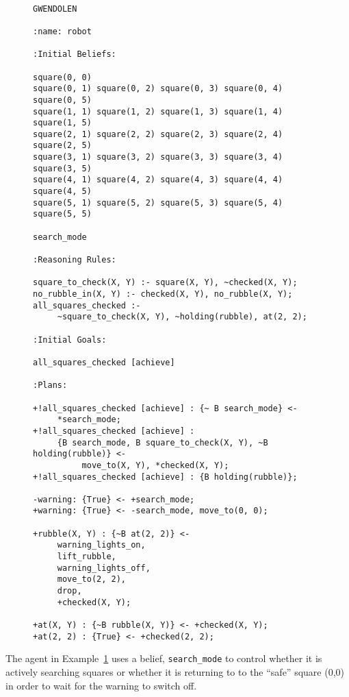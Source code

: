 \begin{figure}[!htbp]
\begin{ourexample}
\label{code:pickuprubble_nolock} \quad \\
\begin{lstlisting}[basicstyle=\sffamily,style=easslisting,language=Gwendolen]
GWENDOLEN

:name: robot

:Initial Beliefs:

square(0, 0) 
square(0, 1) square(0, 2) square(0, 3) square(0, 4) square(0, 5)
square(1, 1) square(1, 2) square(1, 3) square(1, 4) square(1, 5)
square(2, 1) square(2, 2) square(2, 3) square(2, 4) square(2, 5)
square(3, 1) square(3, 2) square(3, 3) square(3, 4) square(3, 5)
square(4, 1) square(4, 2) square(4, 3) square(4, 4) square(4, 5)
square(5, 1) square(5, 2) square(5, 3) square(5, 4) square(5, 5)

search_mode

:Reasoning Rules:

square_to_check(X, Y) :- square(X, Y), ~checked(X, Y);
no_rubble_in(X, Y) :- checked(X, Y), no_rubble(X, Y);
all_squares_checked :- 
     ~square_to_check(X, Y), ~holding(rubble), at(2, 2);

:Initial Goals:

all_squares_checked [achieve]

:Plans:

+!all_squares_checked [achieve] : {~ B search_mode} <- 
     *search_mode;
+!all_squares_checked [achieve] : 
     {B search_mode, B square_to_check(X, Y), ~B holding(rubble)} <- 
          move_to(X, Y), *checked(X, Y);
+!all_squares_checked [achieve] : {B holding(rubble)};

-warning: {True} <- +search_mode;
+warning: {True} <- -search_mode, move_to(0, 0);

+rubble(X, Y) : {~B at(2, 2)} <- 
     warning_lights_on, 
     lift_rubble, 
     warning_lights_off, 
     move_to(2, 2), 
     drop, 
     +checked(X, Y);

+at(X, Y) : {~B rubble(X, Y)} <- +checked(X, Y);
+at(2, 2) : {True} <- +checked(2, 2);
\end{lstlisting}
\end{ourexample}
\end{figure}
The agent in Example~\ref{code:pickuprubble_nolock} uses a belief, \lstinline{search_mode} to control whether it is actively searching squares or whether it is returning to to the ``safe'' square (0,0) in order to wait for the warning to switch off.  


